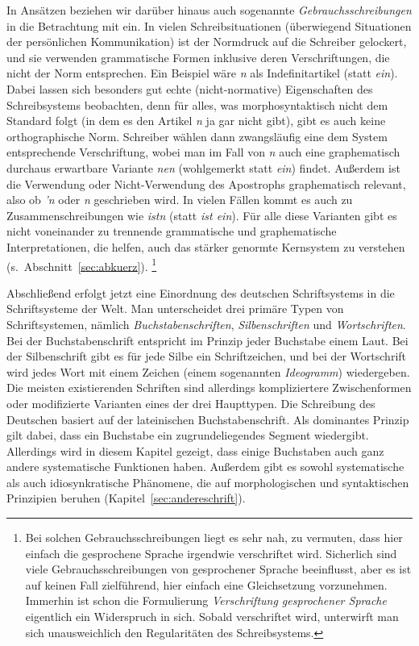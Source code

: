 In Ansätzen beziehen wir darüber hinaus auch sogenannte \textit{Gebrauchsschreibungen} in die Betrachtung mit ein.
In vielen Schreibsituationen (überwiegend Situationen der persönlichen Kommunikation) ist der Normdruck auf die Schreiber gelockert, und sie verwenden grammatische Formen inklusive deren Verschriftungen, die nicht der Norm entsprechen.
Ein Beispiel wäre \textit{n} als Indefinitartikel (statt \textit{ein}).
Dabei lassen sich besonders gut echte (nicht-normative) Eigenschaften des Schreibsystems beobachten, denn für alles, was morphosyntaktisch nicht dem Standard folgt (in dem es den Artikel \textit{n} ja gar nicht gibt), gibt es auch keine orthographische Norm.
Schreiber wählen dann zwangsläufig eine dem System entsprechende Verschriftung, wobei man im Fall von \textit{n} auch eine graphematisch durchaus erwartbare Variante \textit{nen} (wohlgemerkt statt \textit{ein}) findet.
Außerdem ist die Verwendung oder Nicht-Verwendung des Apostrophs graphematisch relevant, also ob \textit{'n} oder \textit{n} geschrieben wird.
In vielen Fällen kommt es auch zu Zusammenschreibungen wie \textit{istn} (statt \textit{ist ein}).
Für alle diese Varianten gibt es nicht voneinander zu trennende grammatische und graphematische Interpretationen, die helfen, auch das stärker genormte Kernsystem zu verstehen (s.\ Abschnitt~\ref{sec:abkuerz}).%
\footnote{Bei solchen Gebrauchsschreibungen liegt es sehr nah, zu vermuten, dass hier einfach die gesprochene Sprache irgendwie verschriftet wird.
Sicherlich sind viele Gebrauchsschreibungen von gesprochener Sprache beeinflusst, aber es ist auf keinen Fall zielführend, hier einfach eine Gleichsetzung vorzunehmen.
Immerhin ist schon die Formulierung \textit{Verschriftung gesprochener Sprache} eigentlich ein Widerspruch in sich.
Sobald verschriftet wird, unterwirft man sich unausweichlich den Regularitäten des Schreibsystems.}

Abschließend erfolgt jetzt eine Einordnung des deutschen Schriftsystems in die Schriftsysteme der Welt.
Man unterscheidet drei primäre Typen von Schriftsystemen, nämlich \textit{Buchstabenschriften}, \textit{Silbenschriften} und \textit{Wortschriften}.
Bei der Buchstabenschrift entspricht im Prinzip jeder Buchstabe einem Laut.
Bei der Silbenschrift gibt es für jede Silbe ein Schriftzeichen, und bei der Wortschrift wird jedes Wort mit einem Zeichen (einem sogenannten \textit{Ideogramm}) wiedergeben.
Die meisten existierenden Schriften sind allerdings kompliziertere Zwischenformen oder modifizierte Varianten eines der drei Haupttypen.
Die Schreibung des Deutschen basiert auf der lateinischen Buchstabenschrift.
Als dominantes Prinzip gilt dabei, dass ein Buchstabe ein zugrundeliegendes Segment wiedergibt.
Allerdings wird in diesem Kapitel gezeigt, dass einige Buchstaben auch ganz andere systematische Funktionen haben.
Außerdem gibt es sowohl systematische als auch idiosynkratische Phänomene, die auf morphologischen und syntaktischen Prinzipien beruhen (Kapitel~\ref{sec:andereschrift}).

